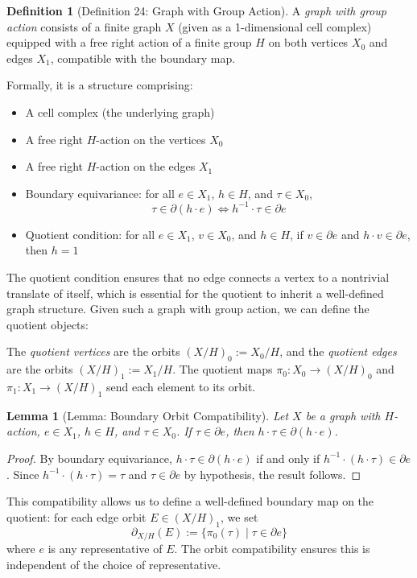 \documentclass[11pt]{article}
\theoremstyle{plain}
\newtheorem*{lemma}{Lemma}
\theoremstyle{definition}
\newtheorem*{definition}{Definition}
\theoremstyle{remark}
\begin{document}
\begin{definition}[Definition 24: Graph with Group Action]
A \emph{graph with group action} consists of a finite graph $X$ (given as a 1-dimensional cell complex) equipped with a free right action of a finite group $H$ on both vertices $X_0$ and edges $X_1$, compatible with the boundary map.

Formally, it is a structure comprising:
\begin{itemize}
\item A cell complex (the underlying graph)
\item A free right $H$-action on the vertices $X_0$
\item A free right $H$-action on the edges $X_1$ 
\item Boundary equivariance: for all $e \in X_1$, $h \in H$, and $\tau \in X_0$,
\[
\tau \in \partial(h \cdot e) \iff h^{-1} \cdot \tau \in \partial e
\]
\item Quotient condition: for all $e \in X_1$, $v \in X_0$, and $h \in H$, if $v \in \partial e$ and $h \cdot v \in \partial e$, then $h = 1$
\end{itemize}
\end{definition}

The quotient condition ensures that no edge connects a vertex to a nontrivial translate of itself, which is essential for the quotient to inherit a well-defined graph structure. Given such a graph with group action, we can define the quotient objects:

The \emph{quotient vertices} are the orbits $(X/H)_0 := X_0/H$, and the \emph{quotient edges} are the orbits $(X/H)_1 := X_1/H$. The quotient maps $\pi_0: X_0 \to (X/H)_0$ and $\pi_1: X_1 \to (X/H)_1$ send each element to its orbit.

\begin{lemma}[Lemma: Boundary Orbit Compatibility]
Let $X$ be a graph with $H$-action, $e \in X_1$, $h \in H$, and $\tau \in X_0$. If $\tau \in \partial e$, then $h \cdot \tau \in \partial(h \cdot e)$.
\end{lemma}

\begin{proof}
By boundary equivariance, $h \cdot \tau \in \partial(h \cdot e)$ if and only if $h^{-1} \cdot (h \cdot \tau) \in \partial e$. Since $h^{-1} \cdot (h \cdot \tau) = \tau$ and $\tau \in \partial e$ by hypothesis, the result follows.
\end{proof}

This compatibility allows us to define a well-defined boundary map on the quotient: for each edge orbit $E \in (X/H)_1$, we set
\[
\partial_{X/H}(E) := \{\pi_0(\tau) \mid \tau \in \partial e\}
\]
where $e$ is any representative of $E$. The orbit compatibility ensures this is independent of the choice of representative.
\end{document}
